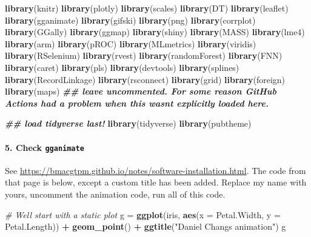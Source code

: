 \documentclass[
]{article}
\newenvironment{Shaded}{\begin{snugshade}}{\end{snugshade}}
\newcommand{\AttributeTok}[1]{\textcolor[rgb]{0.13,0.29,0.53}{#1}}
\newcommand{\CommentTok}[1]{\textcolor[rgb]{0.56,0.35,0.01}{\textit{#1}}}
\newcommand{\DocumentationTok}[1]{\textcolor[rgb]{0.56,0.35,0.01}{\textbf{\textit{#1}}}}
\newcommand{\FunctionTok}[1]{\textcolor[rgb]{0.13,0.29,0.53}{\textbf{#1}}}
\newcommand{\NormalTok}[1]{#1}
\newcommand{\OtherTok}[1]{\textcolor[rgb]{0.56,0.35,0.01}{#1}}
\newcommand{\SpecialCharTok}[1]{\textcolor[rgb]{0.81,0.36,0.00}{\textbf{#1}}}
\newcommand{\StringTok}[1]{\textcolor[rgb]{0.31,0.60,0.02}{#1}}
\begin{document}
\begin{Shaded}
\begin{Highlighting}[]
\FunctionTok{library}\NormalTok{(knitr)}
\FunctionTok{library}\NormalTok{(plotly)}
\FunctionTok{library}\NormalTok{(scales)}
\FunctionTok{library}\NormalTok{(DT)}
\FunctionTok{library}\NormalTok{(leaflet)}
\FunctionTok{library}\NormalTok{(gganimate)}
\FunctionTok{library}\NormalTok{(gifski)}
\FunctionTok{library}\NormalTok{(png)}
\FunctionTok{library}\NormalTok{(corrplot)}
\FunctionTok{library}\NormalTok{(GGally)}
\FunctionTok{library}\NormalTok{(ggmap)}
\FunctionTok{library}\NormalTok{(shiny)}
\FunctionTok{library}\NormalTok{(MASS)}
\FunctionTok{library}\NormalTok{(lme4)}
\FunctionTok{library}\NormalTok{(arm)}
\FunctionTok{library}\NormalTok{(pROC)}
\FunctionTok{library}\NormalTok{(MLmetrics)}
\FunctionTok{library}\NormalTok{(viridis)}
\FunctionTok{library}\NormalTok{(RSelenium)}
\FunctionTok{library}\NormalTok{(rvest)}
\FunctionTok{library}\NormalTok{(randomForest)}
\FunctionTok{library}\NormalTok{(FNN)}
\FunctionTok{library}\NormalTok{(caret)}
\FunctionTok{library}\NormalTok{(pls)}
\FunctionTok{library}\NormalTok{(devtools)}
\FunctionTok{library}\NormalTok{(splines)}
\FunctionTok{library}\NormalTok{(RecordLinkage)}
\FunctionTok{library}\NormalTok{(rsconnect)}
\FunctionTok{library}\NormalTok{(grid)}
\FunctionTok{library}\NormalTok{(foreign)}
\FunctionTok{library}\NormalTok{(maps) }\DocumentationTok{\#\# leave uncommented. For some reason GitHub Actions had a problem when this wasn\textquotesingle{}t explicitly loaded here. }

\DocumentationTok{\#\# load tidyverse last!}
\FunctionTok{library}\NormalTok{(tidyverse)}
\FunctionTok{library}\NormalTok{(pubtheme)}
\end{Highlighting}
\end{Shaded}

\paragraph{\texorpdfstring{5. Check
\texttt{gganimate}}{5. Check gganimate}}\label{check-gganimate}

See \url{https://bmacgtpm.github.io/notes/software-installation.html}.
The code from that page is below, except a custom title has been added.
Replace my name with yours, uncomment the animation code, run all of
this code.

\begin{Shaded}
\begin{Highlighting}[]
\CommentTok{\# We\textquotesingle{}ll start with a static plot}
\NormalTok{g }\OtherTok{=} \FunctionTok{ggplot}\NormalTok{(iris, }
            \FunctionTok{aes}\NormalTok{(}\AttributeTok{x =}\NormalTok{ Petal.Width, }
                \AttributeTok{y =}\NormalTok{ Petal.Length)) }\SpecialCharTok{+} 
  \FunctionTok{geom\_point}\NormalTok{() }\SpecialCharTok{+} 
  \FunctionTok{ggtitle}\NormalTok{(}\StringTok{"Daniel Chang\textquotesingle{}s animation"}\NormalTok{)}
\NormalTok{g}
\end{Highlighting}
\end{Shaded}
\end{document}
